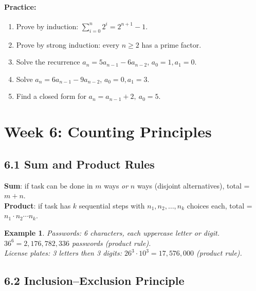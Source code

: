 \documentclass[11pt]{article}
\newtheorem{example}[definition]{Example}
\newenvironment{practice}{\paragraph*{\textbf{Practice:}}}{}
\begin{document}
\begin{practice}
\begin{enumerate}[nosep,label=\arabic*.]
  \item Prove by induction: $\sum_{i=0}^n 2^i = 2^{n+1}-1$.
  \item Prove by strong induction: every $n\ge2$ has a prime factor.
  \item Solve the recurrence $a_n=5a_{n-1}-6a_{n-2}$, $a_0=1,a_1=0$.
  \item Solve $a_n=6a_{n-1}-9a_{n-2}$, $a_0=0,a_1=3$.
  \item Find a closed form for $a_n=a_{n-1}+2,\ a_0=5$.
\end{enumerate}
\end{practice}

\newpage
\section{Week 6: Counting Principles}
\setcounter{definition}{0}

\subsection*{6.1 Sum and Product Rules}

\begin{tcolorbox}[keybox={Sum and Product Rules}]
\textbf{Sum}: if task can be done in $m$ ways \emph{or} $n$ ways (disjoint alternatives), total = $m+n$.\\
\textbf{Product}: if task has $k$ sequential steps with $n_1,n_2,\ldots,n_k$ choices each, total = $n_1\cdot n_2\cdots n_k$.
\end{tcolorbox}

\begin{example}
Passwords: 6 characters, each uppercase letter or digit. $36^6=2{,}176{,}782{,}336$ passwords (product rule).\\
License plates: 3 letters then 3 digits: $26^3\cdot10^3=17{,}576{,}000$ (product rule).
\end{example}

\subsection*{6.2 Inclusion--Exclusion Principle}
\end{document}
